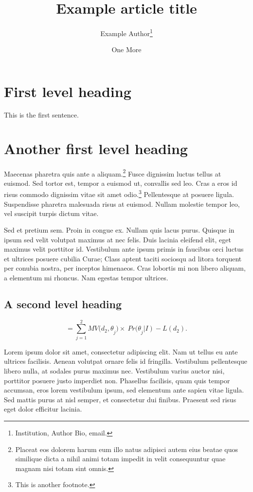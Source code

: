 \documentclass[law]{crclart}
\title{Example article title}
\author{Example Author\thanks{Institution, Author Bio, email.} \and One More}
\begin{document}
\maketitle


\section{First level heading}

This is the first sentence. \lipsum[1]

\section{Another first level heading}

Maecenas pharetra quis ante a aliquam.\footnote{Placeat eos dolorem harum eum
  illo natus adipisci autem eius beatae quos similique dicta a nihil animi totam
  impedit in velit consequuntur quae magnam nisi totam sint omnis.} Fusce
dignissim luctus tellus at euismod. Sed tortor est, tempor a euismod ut,
convallis sed leo. Cras a eros id risus commodo dignissim vitae sit amet
odio.\footnote{This is another footnote. } Pellentesque at posuere ligula.
Suspendisse pharetra malesuada risus at euismod. Nullam molestie tempor leo, vel
suscipit turpis dictum vitae.\cite{Bankowski_Schafer_2007}

Sed et pretium sem. Proin in congue
ex. Nullam quis lacus purus. Quisque in ipsum sed velit
volutpat maximus at nec felis. Duis lacinia eleifend elit, eget maximus velit
porttitor id. Vestibulum ante ipsum primis in faucibus orci luctus et ultrices
posuere cubilia Curae; Class aptent taciti sociosqu ad litora torquent per
conubia nostra, per inceptos himenaeos. Cras lobortis mi non libero aliquam, a
elementum mi rhoncus. Nam egestas tempor ultrices.

\subsection{A second level heading}

$$=\sum_{j=1}^{2}{{MV(d_2,\theta}_j)}\times\
  {Pr(\theta}_j\left|I\right)-L\left(d_2\right).$$

Lorem ipsum dolor sit amet, consectetur adipiscing elit. Nam ut tellus eu ante
ultrices facilisis. Aenean volutpat ornare felis id fringilla. Vestibulum
pellentesque libero nulla, at sodales purus maximus nec. Vestibulum varius
auctor nisi, porttitor posuere justo imperdiet non. Phasellus facilisis, quam
quis tempor accumsan, eros lorem vestibulum ipsum, sed elementum ante sapien
vitae ligula. Sed mattis purus at nisl semper, et consectetur dui finibus.
Praesent sed risus eget dolor efficitur lacinia.
\end{document}
